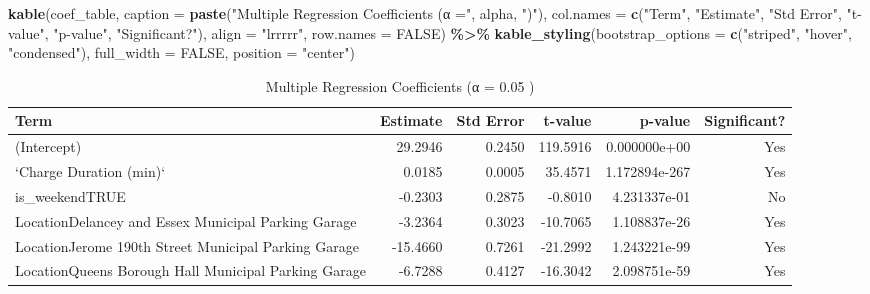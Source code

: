 \documentclass[
  12pt,
]{article}
\newenvironment{Shaded}{\begin{snugshade}}{\end{snugshade}}
\newcommand{\AttributeTok}[1]{\textcolor[rgb]{0.13,0.29,0.53}{#1}}
\newcommand{\ConstantTok}[1]{\textcolor[rgb]{0.56,0.35,0.01}{#1}}
\newcommand{\FunctionTok}[1]{\textcolor[rgb]{0.13,0.29,0.53}{\textbf{#1}}}
\newcommand{\NormalTok}[1]{#1}
\newcommand{\SpecialCharTok}[1]{\textcolor[rgb]{0.81,0.36,0.00}{\textbf{#1}}}
\newcommand{\StringTok}[1]{\textcolor[rgb]{0.31,0.60,0.02}{#1}}
\begin{document}
\begin{Shaded}
\begin{Highlighting}[]
\FunctionTok{kable}\NormalTok{(coef\_table, }\AttributeTok{caption =} \FunctionTok{paste}\NormalTok{(}\StringTok{"Multiple Regression Coefficients (α ="}\NormalTok{,}
\NormalTok{    alpha, }\StringTok{")"}\NormalTok{), }\AttributeTok{col.names =} \FunctionTok{c}\NormalTok{(}\StringTok{"Term"}\NormalTok{, }\StringTok{"Estimate"}\NormalTok{, }\StringTok{"Std Error"}\NormalTok{,}
    \StringTok{"t{-}value"}\NormalTok{, }\StringTok{"p{-}value"}\NormalTok{, }\StringTok{"Significant?"}\NormalTok{), }\AttributeTok{align =} \StringTok{"lrrrrr"}\NormalTok{,}
    \AttributeTok{row.names =} \ConstantTok{FALSE}\NormalTok{) }\SpecialCharTok{\%\textgreater{}\%}
    \FunctionTok{kable\_styling}\NormalTok{(}\AttributeTok{bootstrap\_options =} \FunctionTok{c}\NormalTok{(}\StringTok{"striped"}\NormalTok{, }\StringTok{"hover"}\NormalTok{, }\StringTok{"condensed"}\NormalTok{),}
        \AttributeTok{full\_width =} \ConstantTok{FALSE}\NormalTok{, }\AttributeTok{position =} \StringTok{"center"}\NormalTok{)}
\end{Highlighting}
\end{Shaded}

\begin{longtable}[t]{lrrrrr}
\caption{\label{tab:unnamed-chunk-18}Multiple Regression Coefficients (α = 0.05 )}\\
\toprule
Term & Estimate & Std Error & t-value & p-value & Significant?\\
\midrule
(Intercept) & 29.2946 & 0.2450 & 119.5916 & 0.000000e+00 & Yes\\
`Charge Duration (min)` & 0.0185 & 0.0005 & 35.4571 & 1.172894e-267 & Yes\\
is\_weekendTRUE & -0.2303 & 0.2875 & -0.8010 & 4.231337e-01 & No\\
LocationDelancey and Essex Municipal Parking Garage & -3.2364 & 0.3023 & -10.7065 & 1.108837e-26 & Yes\\
LocationJerome 190th Street Municipal Parking Garage & -15.4660 & 0.7261 & -21.2992 & 1.243221e-99 & Yes\\
\addlinespace
LocationQueens Borough Hall Municipal Parking Garage & -6.7288 & 0.4127 & -16.3042 & 2.098751e-59 & Yes\\
\bottomrule
\end{longtable}
\end{document}
